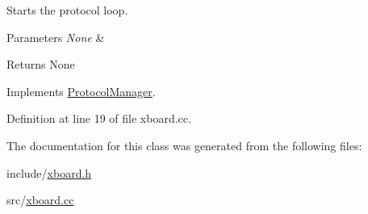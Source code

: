 Starts the protocol loop. 


\begin{DoxyParams}{Parameters}
{\em None} & \\
\hline
\end{DoxyParams}
\begin{DoxyReturn}{Returns}
None 
\end{DoxyReturn}


Implements \mbox{\hyperlink{classProtocolManager_aa3ae25a03e2f070ea486fd9319715a6a}{Protocol\+Manager}}.



Definition at line 19 of file xboard.\+cc.



The documentation for this class was generated from the following files\+:\begin{DoxyCompactItemize}
\item 
include/\mbox{\hyperlink{xboard_8h}{xboard.\+h}}\item 
src/\mbox{\hyperlink{xboard_8cc}{xboard.\+cc}}\end{DoxyCompactItemize}
